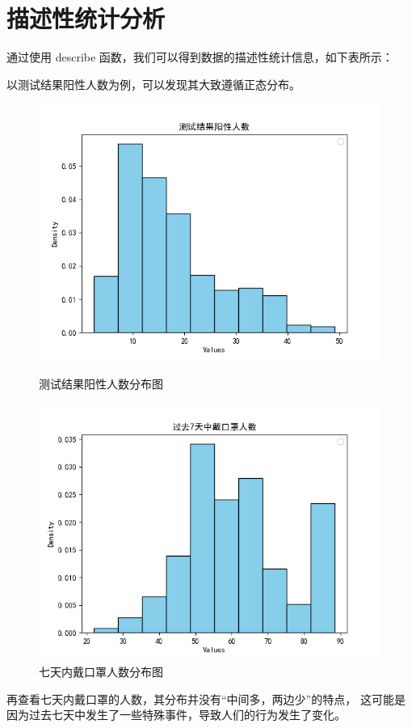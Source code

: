 \documentclass[UTF8,ctexart,a4paper,11pt,openany]{article}
\theoremstyle{definition}
\begin{document}
\section{描述性统计分析}
通过使用 describe 函数，我们可以得到数据的描述性统计信息，如下表所示：
\begin{table}[H]
\centering
\small
{}
\end{table}
以测试结果阳性人数为例，可以发现其大致遵循正态分布。
\begin{figure}[H]
\centering
\begin{minipage}{0.45\textwidth}
    \centering
    \includegraphics[width=\textwidth]{Figure_1.png}
    \caption{测试结果阳性人数分布图}
    \label{fig:positive_cases}
\end{minipage}
\hfill
\begin{minipage}{0.45\textwidth}
    \centering
    \includegraphics[width=\textwidth]{Figure_2.png}
    \caption{七天内戴口罩人数分布图}
    \label{fig:mask_wearing}
\end{minipage}
\end{figure}
再查看七天内戴口罩的人数，其分布并没有“中间多，两边少”的特点，
这可能是因为过去七天中发生了一些特殊事件，导致人们的行为发生了变化。
\end{document}
